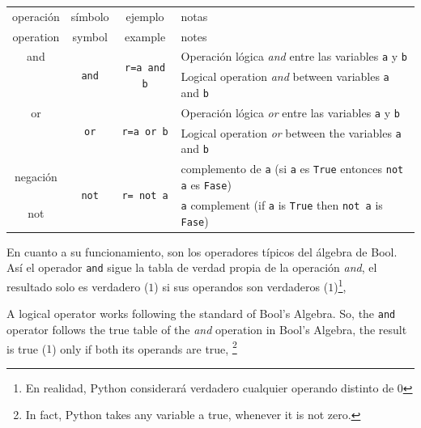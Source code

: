 \begin{table}[h]
\label{tablo1}
\centering
\begin{tabular}{cccm{7cm}}
\hline
\hline
operación&símbolo&ejemplo&notas\\
operation&symbol&example&notes\\
\hline
and&\multirow{2}{*}{\texttt{and}}&\multirow{2}{*}{\texttt{r=a and b}}&Operación lógica \emph{and} entre las variables \texttt{a} y \texttt{b} \\
&&& Logical operation \emph{and} between variables \texttt{a} and \texttt{b}\\
\hline
or &\multirow{2}{*}{\texttt{or}}&\multirow{2}{*}{\texttt{r=a or b}}& Operación lógica \emph{or} entre las variables \texttt{a} y \texttt{b}\\
&&& Logical operation \emph{or} between the variables \texttt{a} and \texttt{b}\\
\hline
negación&\multirow{2}{*}{\texttt{not}}&\multirow{2}{*}{\texttt{r= not a}}&complemento de \texttt{a} (si \texttt{a} es \texttt{True} entonces \texttt{not a} es \texttt{Fase})\\
not &&& \texttt{a} complement (if \texttt{a} is \texttt{True} then \texttt{not a} is \texttt{Fase})\\
\hline
\hline
\end{tabular}
\end{table} 

\begin{paracol}{2}
En cuanto a su funcionamiento, son los operadores típicos del álgebra de Bool. Así el operador \texttt{and} sigue la tabla de verdad propia de la operación \emph{and}, el resultado solo es verdadero ($1$) si sus operandos son verdaderos ($1$)\footnote{En realidad, Python considerará verdadero cualquier operando distinto de $0$},

\switchcolumn
A logical operator works following the standard of Bool's Algebra. So, the \texttt{and} operator follows the true table of the \emph{and} operation in Bool's Algebra, the result is true ($1$) only if both its operands are true, \footnote{In fact, Python takes any variable a true, whenever it is not zero.}     
\end{paracol}

